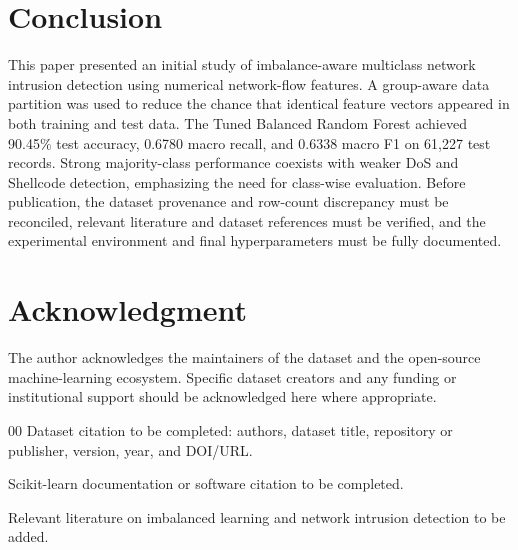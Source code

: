 \documentclass[conference]{IEEEtran}
\begin{document}
\section{Conclusion}
This paper presented an initial study of imbalance-aware multiclass network intrusion detection using numerical network-flow features. A group-aware data partition was used to reduce the chance that identical feature vectors appeared in both training and test data. The Tuned Balanced Random Forest achieved 90.45\% test accuracy, 0.6780 macro recall, and 0.6338 macro F1 on 61,227 test records. Strong majority-class performance coexists with weaker DoS and Shellcode detection, emphasizing the need for class-wise evaluation. Before publication, the dataset provenance and row-count discrepancy must be reconciled, relevant literature and dataset references must be verified, and the experimental environment and final hyperparameters must be fully documented.

\section*{Acknowledgment}
The author acknowledges the maintainers of the dataset and the open-source machine-learning ecosystem. Specific dataset creators and any funding or institutional support should be acknowledged here where appropriate.

\begin{thebibliography}{00}
Dataset citation to be completed: authors, dataset title, repository or publisher, version, year, and DOI/URL.

Scikit-learn documentation or software citation to be completed.

Relevant literature on imbalanced learning and network intrusion detection to be added.
\end{thebibliography}
\end{document}
